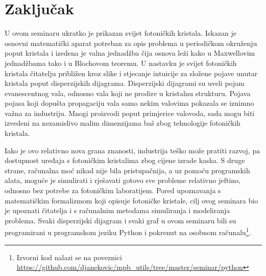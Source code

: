 \documentclass[utf8, seminar, numeric]{fer}
\begin{document}
\chapter{Zaključak}

U ovom seminaru ukratko je prikazan svijet fotoničkih kristala. Iskazan je osnovni
matematički aparat potreban za opis problema u periodičkom okruženju poput
kristala i izedena je valna jednadžba čija osnova leži kako u Maxwellovim
jednadžbama tako i u Blochovom teoremu. U nastavku je svijet fotoničkih kristala
čitatelju približen kroz slike i stjecanje intuicije za složene pojave unutar
kristala poput disperzijskih dijagrama. Disperzijski dijagrami su uveli pojam
evanescentnog vala, odnosno vala koji ne prodire u kristalnu strukturu. Pojava
pojasa koji dopušta propagaciju vala samo nekim valovima pokazala se iznimno
važna za industriju. Mnogi proizvodi poput primjerice valovoda, sada mogu biti
izvedeni na nezamislivo malim dimenzijama baš zbog tehnologije fotoničkih
kristala.

Iako je ovo relativno nova grana znanosti, industrija teško može pratiti
razvoj, pa dostupnost uređaja s fotoničkim kristalima zbog cijene izrade kaska.
S druge strane, računalna moć nikad nije bila pristupačnija, a uz pomoću
programskih alata, moguće je simulirati i rješavati gotovo sve probleme
relativno jeftino, odnosno bez potrebe za fotoničkim laboratijem. Pored
upoznavanja s matematičkim formalizmom koji opisuje fotoničke kristale, cilj ovog
seminara bio je upoznati čitatelja i s računalnim metodama simuliranja i
modeliranja problema. Svaki disperzijski dijagram i svaki graf u ovom seminaru
bili su programirani u programskom jeziku Python i pokrenut na osobnom
računalu\footnote{ Izvorni kod nalazi se na poveznici
\url{https://github.com/djanekovic/mpb_utils/tree/master/seminar/python}}.




\nocite{*}
\end{document}
